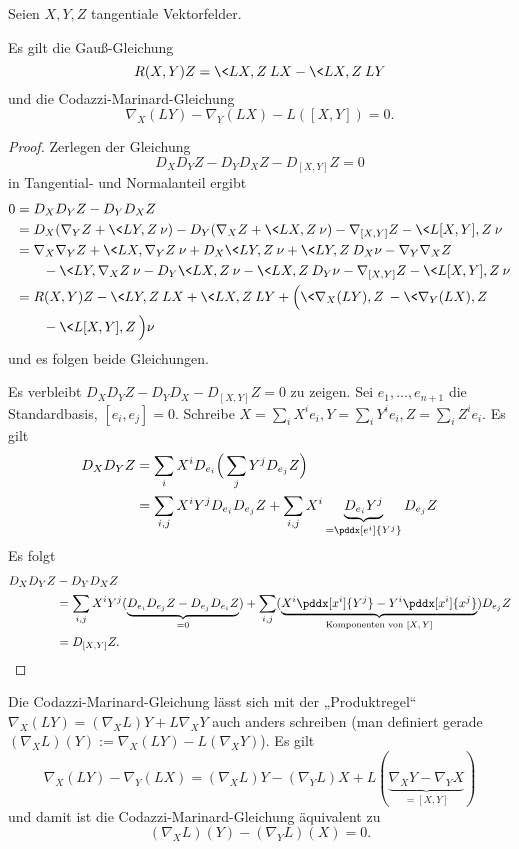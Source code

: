 \begin{nt}
	Seien $X, Y, Z$ tangentiale Vektorfelder.

	Es gilt die Gauß-Gleichung
	\[
		R(X,Y) Z = \<LX, Z\> LX - \< LX, Z\> LY \\
	\]
	und die Codazzi-Marinard-Gleichung
	\[
		\nabla_X(LY) - \nabla_Y(LX) - L([X,Y]) = 0.
	\]
	\begin{proof}
		Zerlegen der Gleichung
		\[
			D_X D_Y Z - D_Y D_X Z - D_{[X,Y]} Z = 0
		\]
		in Tangential- und Normalanteil ergibt
		\begin{align*}
			0 &= D_X D_Y Z - D_Y D_X Z \\
			&= D_X(\nabla_Y Z + \<LY, Z\> \nu) - D_Y(\nabla_X Z + \<LX, Z\> \nu)
				- \nabla_{[X,Y]}Z - \<L[X,Y], Z\> \nu \\
			&= \nabla_X \nabla_Y Z + \<LX, \nabla_Y Z\> \nu + D_X\<LY, Z\> \nu + \< LY, Z\> D_X \nu
				- \nabla_Y \nabla_X Z \\
				 &\qquad - \<LY, \nabla_X Z\> \nu - D_Y\<LX, Z\> \nu - \< LX, Z\> D_Y \nu
				- \nabla_{[X,Y]} Z - \<L[X,Y], Z\> \nu \\
			&= R(X, Y) Z - \<LY, Z\>LX + \<LX, Z\>LY + \Big( \<\nabla_X(LY), Z\> - \< \nabla_Y(LX), Z\> \\
		 	&\qquad - \<L[X,Y], Z\> \Big) \nu
		\end{align*}
		und es folgen beide Gleichungen.

		Es verbleibt $D_X D_Y Z - D_Y D_X - D_{[X,Y]} Z = 0$ zu zeigen.
		Sei $e_1, \dotsc, e_{n+1}$ die Standardbasis, $[e_i, e_j] = 0$.
		Schreibe $X = \sum_i X^i e_i, Y = \sum_i Y^i e_i, Z = \sum_i Z^i e_i$.
		Es gilt
		\begin{align*}
			D_X D_Y Z
			&= \sum_i X^i D_{e_i} \Big(\sum_j Y^j D_{e_j} Z \Big) \\
			&= \sum_{i,j} X^i Y^j D_{e_i} D_{e_j} Z + \sum_{i,j} X^i \underbrace{D_{e_i} Y^j}_{= \pddx[e^i]{Y^j}} D_{e_j} Z
		\end{align*}
		Es folgt
		\begin{align*}
			D_X D_Y Z &- D_Y D_X Z \\
			&= \sum_{i,j} X^i Y^j (\underbrace{D_{e_i} D_{e_j} Z - D_{e_j} D_{e_i} Z}_{=0}) + \sum_{i,j} (\underbrace{ X^i \pddx[x^i]{Y^j} - Y^i \pddx[x^i]{x^j} }_{\text{Komponenten von $[X,Y]$}}) D_{e_j} Z \\
			&= D_{[X,Y]} Z.
		\end{align*}
	\end{proof}
	\begin{note}
		Die Codazzi-Marinard-Gleichung lässt sich mit der „Produktregel“ \\ 
		$\nabla_X(LY) = (\nabla_X L) Y + L \nabla_X Y$ auch anders schreiben (man definiert gerade $(\nabla_X L)(Y) := \nabla_X(LY) - L(\nabla_X Y)$).
		Es gilt
		\[
			\nabla_X(LY) - \nabla_Y(LX)
			= (\nabla_X L) Y - (\nabla_Y L) X + L(\underbrace{\nabla_X Y - \nabla_Y X}_{=[X,Y]})
		\]
		und damit ist die Codazzi-Marinard-Gleichung äquivalent zu
		\[
			(\nabla_X L)(Y) - (\nabla_Y L)(X) = 0.
		\]
	\end{note}
\end{nt}

